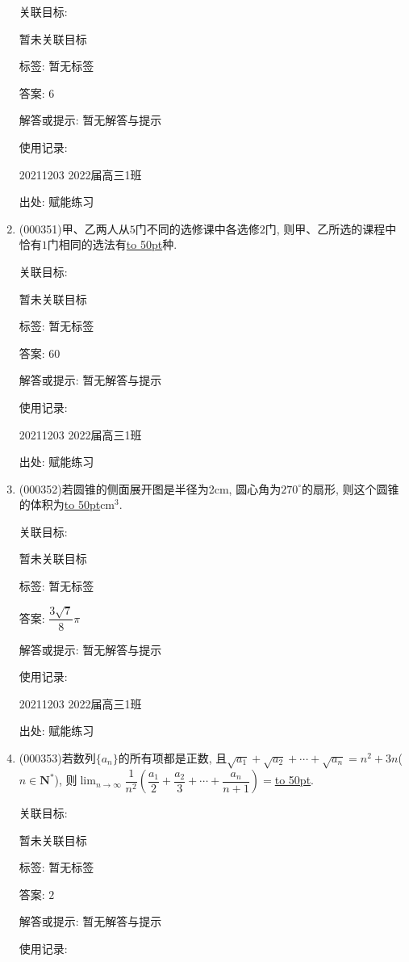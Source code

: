 \documentclass[10pt,a4paper]{article}
\newcommand{\blank}[1]{\underline{\hbox to #1pt{}}}
\begin{document}
\begin{enumerate}[1.]
关联目标:

暂未关联目标



标签: 暂无标签

答案: $6$

解答或提示: 暂无解答与提示

使用记录:

20211203	2022届高三1班	


出处: 赋能练习
\item { (000351)}甲、乙两人从$5$门不同的选修课中各选修$2$门, 则甲、乙所选的课程中恰有$1$门相同的选法有\blank{50}种.


关联目标:

暂未关联目标



标签: 暂无标签

答案: $60$

解答或提示: 暂无解答与提示

使用记录:

20211203	2022届高三1班	


出处: 赋能练习
\item { (000352)}若圆锥的侧面展开图是半径为2$\text{cm}$, 圆心角为$270^\circ$的扇形, 则这个圆锥的体积为\blank{50}$\text{cm}^3$.


关联目标:

暂未关联目标



标签: 暂无标签

答案: $\dfrac{3\sqrt 7}8\pi$

解答或提示: 暂无解答与提示

使用记录:

20211203	2022届高三1班	


出处: 赋能练习
\item { (000353)}若数列$\{a_n\}$的所有项都是正数, 且$\sqrt{a_1}+\sqrt{a_2}+\cdots +\sqrt{a_n}=n^2+3n$($n\in \mathbf{N}^*$), 则$\displaystyle\lim_{n\to\infty}\dfrac{1}{n^2}(\dfrac{a_1}{2}+\dfrac{a_2}{3}+\cdots +\dfrac{a_n}{n+1})=$\blank{50}.


关联目标:

暂未关联目标



标签: 暂无标签

答案: $2$

解答或提示: 暂无解答与提示

使用记录:


\end{enumerate}
\end{document}
